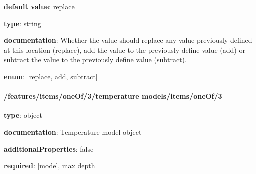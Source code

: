 \begin{itemized}
\item {\bf default value}: replace
\item {\bf type}: string
\item {\bf documentation}: Whether the value should replace any value previously defined at this location (replace), add the value to the previously define value (add) or subtract the value to the previously define value (subtract).
\item {\bf enum}: [replace, add, subtract]\end{itemized}\paragraph{/features/items/oneOf/3/temperature models/items/oneOf/3} \begin{itemized}
\item {\bf type}: object
\item {\bf documentation}: Temperature model object
\item {\bf additionalProperties}: false
\item {\bf required}: [model, max depth]\end{itemized}
